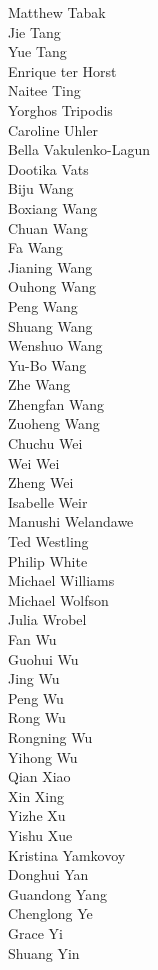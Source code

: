 Matthew Tabak\\
Jie Tang\\
Yue Tang\\
Enrique ter Horst\\
Naitee Ting\\
Yorghos Tripodis\\
Caroline Uhler\\
Bella Vakulenko-Lagun\\
Dootika Vats\\
Biju Wang\\
Boxiang Wang\\
Chuan Wang\\
Fa Wang\\
Jianing Wang\\
Ouhong Wang\\
Peng Wang\\
Shuang Wang\\
Wenshuo Wang\\
Yu-Bo Wang\\
Zhe Wang\\
Zhengfan Wang\\
Zuoheng Wang\\
Chuchu Wei\\
Wei Wei\\
Zheng Wei\\
Isabelle Weir\\
Manushi Welandawe\\
Ted Westling\\
Philip White\\
Michael Williams\\
Michael Wolfson\\
Julia Wrobel\\
Fan Wu\\
Guohui Wu\\
Jing Wu\\
Peng Wu\\
Rong Wu\\
Rongning Wu\\
Yihong Wu\\
Qian Xiao\\
Xin Xing\\
Yizhe Xu\\
Yishu Xue\\
Kristina Yamkovoy\\
Donghui Yan\\
Guandong Yang\\
Chenglong Ye\\
Grace Yi\\
Shuang Yin\\
